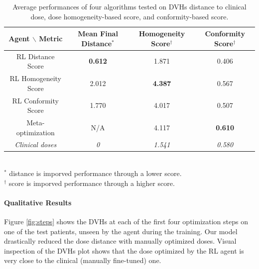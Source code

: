 \begin{table}
	\begin{center}
		\begin{tabular}{| c || c | c | c |} 
			\hline
			Agent $\backslash$ Metric & Mean Final Distance$^*$ & Homogeneity Score$^\dagger$ & Conformity Score$^\dagger$ \\ 
			\hline
			RL Distance Score & \textbf{0.612} & 1.871 & 0.406 \\ 
			RL Homogeneity Score & 2.012 & \textbf{4.387} & 0.567 \\
			RL Conformity Score &  1.770  & 4.017 & 0.507 \\
			Meta-optimization & N/A & 4.117 & \textbf{0.610} \\
			\textit{Clinical doses} & \textit{0} & \textit{1.541} & \textit{0.580} \\	
			\hline
		\end{tabular}
		\\
		$^*$ distance is imporved performance through a lower score.\\
		$^\dagger$ score is imporved performance through a higher score.
	\end{center}
	\caption{
		Average performances of four algorithms tested on DVHs distance to clinical dose, dose homogeneity-based score, and conformity-based score.
	}
	\label{table:performances_RL_algorithms}
\end{table}

\paragraph{Qualitative Results}
Figure \ref{fig:steps} shows the DVHs at each of the first four optimization steps on one of the test patients, unseen by the agent during the training.
Our model drastically reduced the dose distance with manually optimized doses.
Visual inspection of the DVHs plot shows that the dose optimized by the RL agent is very close to the clinical (manually fine-tuned) one.

